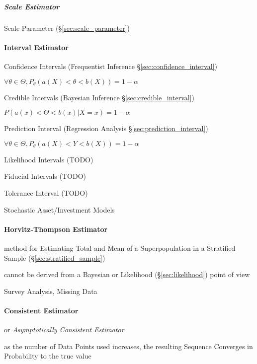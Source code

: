 \subparagraph{Scale Estimator}\label{sec:scale_estimator}

Scale Parameter (\S\ref{sec:scale_parameter})



\paragraph{Interval Estimator}\label{sec:interval_estimator}\hfill

Confidence Intervals (Frequentist Inference \S\ref{sec:confidence_interval})

$\forall \theta \in \Theta, P_\theta(a(X) < \theta < b(X)) = 1 - \alpha$

Credible Intervals (Bayesian Inference \S\ref{sec:credible_interval})

$P(a(x) < \Theta < b(x) | X = x) = 1 - \alpha$

Prediction Interval (Regression Analysis \S\ref{sec:prediction_interval})

$\forall \theta \in \Theta, P_\theta(a(X) < Y < b(X)) = 1 - \alpha$

Likelihood Intervals (TODO)

Fiducial Intervals (TODO)

Tolerance Interval (TODO)

Stochastic Asset/Investment Models



\paragraph{Horvitz-Thompson Estimator}\label{sec:horvitz_thompson}\hfill

method for Estimating Total and Mean of a Superpopulation in a Stratified Sample
(\S\ref{sec:stratified_sample})

cannot be derived from a Bayesian or Likelihood (\S\ref{sec:likelihood}) point
of view

Survey Analysis, Missing Data



\paragraph{Consistent Estimator}\label{sec:consistent_estimator}\hfill

or \emph{Asymptotically Consistent Estimator}

as the number of Data Points used increases, the resulting Sequence Converges in
Probability to the true value



